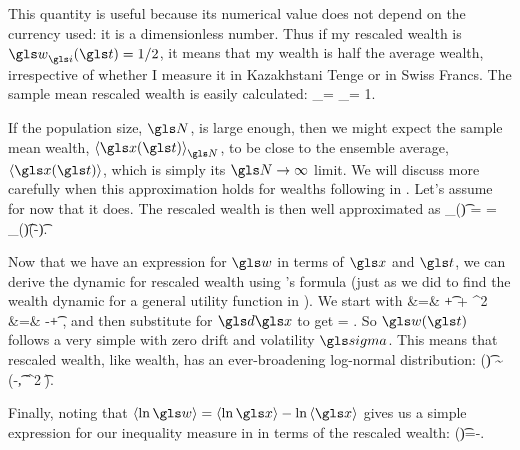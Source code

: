 
This quantity is useful because its numerical value does not 
depend on the currency used: it is a dimensionless number. 
Thus if my rescaled wealth is $\gw_\gi(\t) = 1/2$, it means that my wealth is half the 
average wealth, irrespective of whether I measure it in Kazakhstani Tenge 
or in Swiss Francs. The sample mean rescaled wealth is easily calculated:
\be
\ave{\gw_\gi(\t)}_\N = \ave{\frac{\x(\t)}{\ave{\x(\t)}_\N}}_\N = 1.
\ee

If the population size, $\N$, is large enough, then we might expect the sample mean wealth, $\ave{\x(\t)}_\N$, to be close to the ensemble average, $\ave{\x(\t)}$, which is simply its $\N\to\infty$ limit. We will discuss more carefully when this approximation holds for wealths following \GBM in . Let's assume for now that it does. The rescaled wealth is then well approximated as
\be
\gw_\gi(\t) = \frac{\x_\gi(\t)}{\ave{\x(\t)}} = \x_\gi(\t)\exp(-\gmu \t).
\ee

Now that we have an expression for $\gw$ in terms of $\x$ and $\t$, we can derive the dynamic for rescaled wealth using \Ito's formula (just as we did to find the wealth dynamic for a general utility function in ). We start with
\bea
\gd \gw &=& \frac{\partial \gw}{\partial \t}\gd\t + \frac{\partial \gw}{\partial \x}\gd\x +   \gd\x^2 \\
&=& -\gmu \gw\gd\t + \frac{\gw}{\x}\gd\x {},
\eea
and then substitute  for $\gd\x$ to get
\be
\gd \gw = \gw \gsigma \gd\gW.
\ee
So $\gw(\t)$ follows a very simple \GBM with zero drift and volatility $\gsigma$. This means that rescaled wealth, like wealth, has an ever-broadening log-normal distribution:
\be
\ln \gw(\t) \sim \mathcal{\N}\left(-\t, \gsigma^2 \t\right).
\ee

Finally, noting that $\ave{\ln \gw}=\ave{\ln \x}-\ln\ave{\x}$ gives us a simple expression for our inequality measure in  in terms of the rescaled wealth:
\be
\J(\t)=-\ave{\ln \gw}.
\ee


